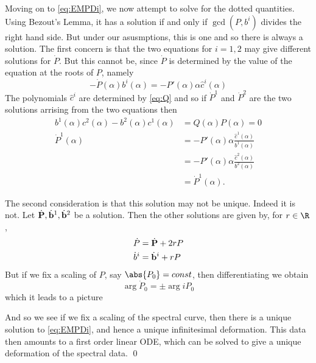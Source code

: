 Moving on to \eqref{eq:EMPDi}, we now attempt to solve for the dotted quantities. Using Bezout's Lemma, it has a solution if and only if $\gcd(P,b^i)$ divides the right hand side. But under our asusmptions, this is one and so there is always a solution. The first concern is that the two equations for $i=1,2$ may give different solutions for $\dot P$. But this cannot be, since $\dot P$ is determined by the value of the equation at the roots of $P$, namely
\[
-\dot P(\alpha) b^i(\alpha) = -P'(\alpha)\alpha\hat c^i(\alpha)
\]
The polynomials $\hat c^i$ are determined by \eqref{eq:Q} and so if $\dot P^1$ and $\dot P^2$ are the two solutions arrising from the two equations then
\begin{align*}
b^1(\alpha) c^2(\alpha) - b^2(\alpha) c^1(\alpha) &= Q(\alpha) P(\alpha) = 0 \\
\dot P^1(\alpha)
&= -P'(\alpha)\alpha \frac{\hat c^1(\alpha)}{b^1(\alpha)} \\
&= -P'(\alpha)\alpha \frac{\hat c^2(\alpha)}{b^2(\alpha)} \\
&= \dot P^1(\alpha).
\end{align*}

The second consideration is that this solution may not be unique. Indeed it is not. Let $\dot {\bf P}, \dot {\bf b}^1, \dot {\bf b}^2$ be a solution. Then the other solutions are given by, for $r\in \R$,
\begin{align*}
\dot P &= \dot {\bf P} + 2rP \\
\dot b^i &= \dot {\bf b}^i + rP \\
\end{align*}
But if we fix a scaling of $P$, say $\abs{P_0} = const$, then differentiating we obtain
\[
\arg \dot P_0 = \pm \arg i P_0
\]
which it leads to a picture

\begin{center}
\end{center}
And so we see if we fix a scaling of the spectral curve, then there is a unique solution to \eqref{eq:EMPDi}, and hence a unique infinitesimal deformation. This data then amounts to a first order linear ODE, which can be solved to give a unique deformation of the spectral data.
\qed









